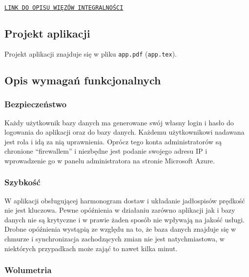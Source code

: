 \documentclass[10pt]{article}
\newcommand{\quotes}[1]{``#1''}
\begin{document}
\noindent \texttt{\href{https://wutwaw-my.sharepoint.com/:x:/g/personal/01143627_pw_edu_pl/ESLyg2i21LRBgUp8RWfRSLgB-xCOXny2bD24kXWuZf6KzA?rtime=QEzI1x4e2Ug}{LINK DO OPISU WIĘZÓW INTEGRALNOŚCI}}

\subsection{Projekt aplikacji}

\noindent Projekt aplikacji znajduje się w pliku \texttt{app.pdf} (\texttt{app.tex}).

\subsection{Opis wymagań funkcjonalnych}

\subsubsection{Bezpieczeństwo}
Każdy użytkownik bazy danych ma generowane swój własny login i hasło do logowania do aplikacji oraz do bazy danych. Każdemu użytkownikowi nadawana jest rola i idą za nią uprawnienia. Oprócz tego konta administratorów są chronione \quotes{firewallem} i niezbędne jest podanie swojego adresu IP i wprowadzenie go w panelu administratora na stronie Microsoft Azure.

\subsubsection{Szybkość}
W aplikacji obsługującej harmonogram dostaw i układanie jadłospisów prędkość nie jest kluczowa. Pewne opóźnienia w działaniu zarówno aplikacji jak i bazy danych nie są krytyczne i w prawie żaden sposób nie wpływają na jakość usługi. Drobne opóźnienia wystąpią ze względu na to, że baza danych znajduje się w chmurze i synchronizacja zachodzących zmian nie jest natychmiastowa, w niektórych przypadkach może zająć to nawet kilka minut.

\subsubsection{Wolumetria}
\end{document}
